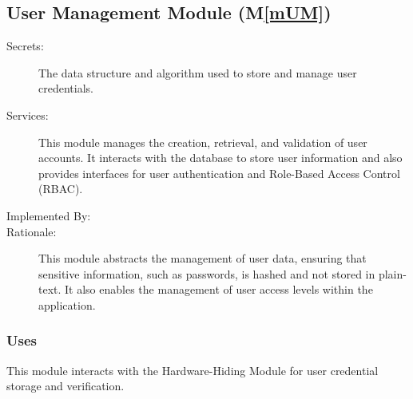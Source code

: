 \documentclass[12pt, titlepage]{article}
\newcommand{\mref}[1]{M\ref{#1}}
\begin{document}
\subsection{User Management Module (\mref{mUM})}
\begin{description}
  \item[Secrets:] The data structure and algorithm used to store and manage user
  credentials.
  \item[Services:]This module manages the creation, retrieval, and validation of
  user accounts. It interacts with the database to store user information and
  also provides interfaces for user authentication and Role-Based Access
  Control (RBAC).
  \item[Implemented By:] \progname{}
  \item[Rationale:] This module abstracts the management of user data, ensuring
  that sensitive information, such as passwords, is hashed and not stored in
  plain-text. It also enables the management of user access levels within the
  application. 
\end{description}

\subsubsection{Uses}
This module interacts with the Hardware-Hiding Module for user credential
storage and verification.
\end{document}
